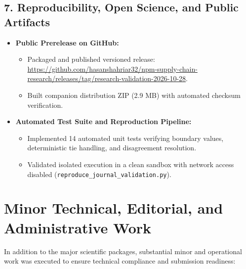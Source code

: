 \documentclass[11pt,a4paper]{article}
\begin{document}
\subsection{7. Reproducibility, Open Science, and Public Artifacts}
\begin{itemize}
  \item \textbf{Public Prerelease on GitHub:}
  \begin{itemize}
    \item Packaged and published versioned release: \url{https://github.com/hasanshahriar32/npm-supply-chain-research/releases/tag/research-validation-2026-10-28}.
    \item Built companion distribution ZIP (2.9 MB) with automated checksum verification.
  \end{itemize}
  \item \textbf{Automated Test Suite and Reproduction Pipeline:}
  \begin{itemize}
    \item Implemented 14 automated unit tests verifying boundary values, deterministic tie handling, and disagreement resolution.
    \item Validated isolated execution in a clean sandbox with network access disabled (\nolinkurl{reproduce_journal_validation.py}).
  \end{itemize}
\end{itemize}

\clearpage
\section{Minor Technical, Editorial, and Administrative Work}

In addition to the major scientific packages, substantial minor and operational work was executed to ensure technical compliance and submission readiness:
\end{document}
